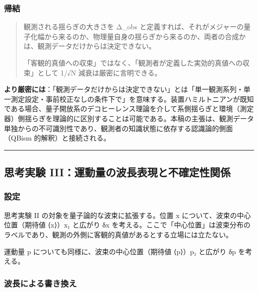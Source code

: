 \documentclass[
  11pt,
]{ltjsarticle}
\begin{document}
\subsubsection{帰結}\label{ux5e30ux7d50-1}

\begin{quote}
観測される揺らぎの大きさを Δ\_obs
と定義すれば、それがメジャーの量子化幅から来るのか、物理量自身の揺らぎから来るのか、両者の合成かは、観測データだけからは決定できない。

「客観的真値への収束」ではなく、「観測者が定義した実効的真値への収束」として
1/√N 減衰は厳密に言明できる。
\end{quote}

\textbf{より厳密には}：「観測データだけからは決定できない」とは「単一観測系列・単一測定設定・事前校正なしの条件下で」を意味する。装置ハミルトニアンが既知である場合、量子開放系のデコヒーレンス理論を介して系側揺らぎと環境（測定器）側揺らぎを理論的に区別することは可能である。本稿の主張は、観測データ単独からの不可識別性であり、観測者の知識状態に依存する認識論的側面（QBism
的解釈）と接続される。

\begin{center}\rule{0.5\linewidth}{0.5pt}\end{center}

\subsection{思考実験
III：運動量の波長表現と不確定性関係}\label{ux601dux8003ux5b9fux9a13-iiiux904bux52d5ux91cfux306eux6ce2ux9577ux8868ux73feux3068ux4e0dux78baux5b9aux6027ux95a2ux4fc2}

\subsubsection{設定}\label{ux8a2dux5b9a-2}

思考実験 II の対象を量子論的な波束に拡張する。位置 x
について、波束の中心位置（期待値 ⟨x⟩）x₁ と広がり δx
を考える。ここで「中心位置」は波束分布のラベルであり、観測の外側に客観的真値があるとする立場には立たない。

運動量 p についても同様に、波束の中心位置（期待値 ⟨p⟩）p₁ と広がり δp
を考える。

\subsubsection{波長による書き換え}\label{ux6ce2ux9577ux306bux3088ux308bux66f8ux304dux63dbux3048}
\end{document}
